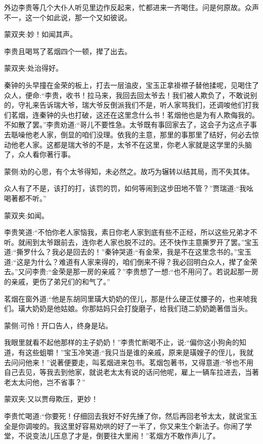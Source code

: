\begin{parag}
    外边李贵等几个大仆人听见里边作反起来，忙都进来一齐喝住。问是何原故。众声不一，这一个如此说，那一个又如彼说。\begin{note}蒙双夹:妙！如闻其声。\end{note}李贵且喝骂了茗烟四个一顿，撵了出去。\begin{note}蒙双夹:处治得好。\end{note}秦钟的头早撞在金荣的板上，打去一层油皮，宝玉正拿褂襟子替他揉呢，见喝住了众人，便命:“李贵，收书！拉马来，我回去回太爷去！我们被人欺负了，不敢说别的，守礼来告诉瑞大爷，瑞大爷反倒派我们不是，听人家骂我们，还调唆他们打我们茗烟，连秦钟的头也打破，这还在这里念什么书！茗烟他也是为有人欺侮我的。不如散了罢。”李贵劝道:“哥儿不要性急。太爷既有事回家去了，这会子为这点子事去聒噪他老人家，倒显的咱们没理。依我的主意，那里的事那里了结好，何必去惊动他老人家。这都是瑞大爷的不是，太爷不在这里，你老人家就是这学里的头脑了，众人看你著行事。\begin{note}蒙侧:劝的心思，有个太爷得知，未必然之。故巧为辗转以结其局，而不失其体。\end{note}众人有了不是，该打的打，该罚的罚，如何等闹到这步田地不管？”贾瑞道:“我吆喝著都不听。”\begin{note}蒙双夹:如闻。\end{note}李贵笑道:“不怕你老人家恼我，素日你老人家到底有些不正经，所以这些兄弟才不听。就闹到太爷跟前去，连你老人家也脱不过的。还不快作主意撕罗开了罢。”宝玉道:“撕罗什么？我必是回去的！”秦钟哭道:“有金荣，我是不在这里念书的。”宝玉道:“这是为什么？难道有人家来得的，咱们倒来不得？我必回明白众人，撵了金荣去。”又问李贵:“金荣是那一房的亲戚？”李贵想了一想:“也不用问了。若说起那一房的亲戚，更伤了弟兄们的和气了。”
\end{parag}


\begin{parag}
    茗烟在窗外道:“他是东胡同里璜大奶奶的侄儿，那是什么硬正仗腰子的，也来唬我们。璜大奶奶是他姑娘。你那姑妈只会打旋磨子，给我们琏二奶奶跪著借当头。\begin{note}蒙侧:可怜！开口告人，终身是玷。\end{note}我眼里就看不起他那样的主子奶奶！”李贵忙断喝不止，说:“偏你这小狗肏的知道，有这些蛆嚼！”宝玉冷笑道:“我只当是谁的亲戚，原来是璜嫂子的侄儿，我就去问问他来！”说著便要走，叫茗烟进来包书。茗烟包著书，又得意道:“爷也不用自己去见，等我去到他家，就说老太太有说的话问他呢，雇上一辆车拉进去，当著老太太问他，岂不省事？”\begin{note}蒙双夹:又以贾母欺压，更妙！\end{note}李贵忙喝道:“你要死！仔细回去我好不好先捶了你，然后再回老爷太太，就说宝玉全是你调唆的。我这里好容易劝哄的好了一半了，你又来生个新法子。你闹了学堂，不说变法儿压息了才是，倒要往大里闹！”茗烟方不敢作声儿了。
\end{parag}


